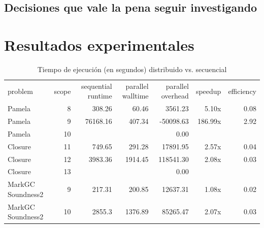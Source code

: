 \subsection{Decisiones que vale la pena seguir investigando}

\section{Resultados experimentales}

\begin{table}[h]\tiny
	\begin{tabular}{lrrrrrr}
		\toprule
		problem	&	scope	&	sequential runtime	&	parallel walltime	&	parallel overhead	&	speedup	&	efficiency \\
		\cmidrule(r){1-7}
		Pamela	&	8	&	308.26	&	60.46	&	3561.23	&	5.10x	&	0.08 \\
		Pamela	&	9	&	76168.16	&	407.34	&	-50098.63	&	186.99x	&	2.92 \\
		Pamela	&	10	&		&		&	0.00	&		&	 \\
		\cmidrule(r){1-7}
		Closure	&	11	&	749.65	&	291.28	&	17891.95	&	2.57x	&	0.04 \\
		Closure	&	12	&	3983.36	&	1914.45	&	118541.30	&	2.08x	&	0.03 \\
		Closure	&	13	&		&		&	0.00	&		&	 \\
		\cmidrule(r){1-7}
		MarkGC Soundness2	&	9	&	217.31	&	200.85	&	12637.31	&	1.08x	&	0.02 \\
		MarkGC Soundness2	&	10	&	2855.3	&	1376.89	&	85265.47	&	2.07x	&	0.03 \\
		\bottomrule
	\end{tabular}
	\caption{Tiempo de ejecución (en segundos) distribuido vs. secuencial}
\end{table}